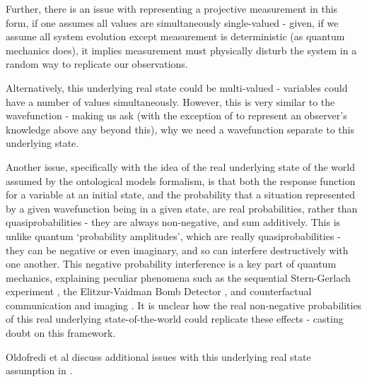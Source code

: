\documentclass[superscriptaddress, floatfix,nofootinbib,12pt]{revtex4-2}
\begin{document}
Further, there is an issue with representing a projective measurement in this form, if one assumes all values are simultaneously single-valued - given, if we assume all system evolution except measurement is deterministic (as quantum mechanics does), it implies measurement must physically disturb the system in a random way to replicate our observations.

Alternatively, this underlying real state could be multi-valued - variables could have a number of values simultaneously. However, this is very similar to the wavefunction - making us ask (with the exception of to represent an observer's knowledge above any beyond this), why we need a wavefunction separate to this underlying state.

Another issue, specifically with the idea of the real underlying state of the world assumed by the ontological models formalism, is that both the response function for a variable at an initial state, and the probability that a situation represented by a given wavefunction being in a given state, are real probabilities, rather than quasiprobabilities - they are always non-negative, and sum additively. This is unlike quantum `probability amplitudes', which are really quasiprobabilities - they can be negative or even imaginary, and so can interfere destructively with one another. This negative probability interference is a key part of quantum mechanics, explaining peculiar phenomena such as the sequential Stern-Gerlach experiment \cite{Sakurai2017Modern}, the Elitzur-Vaidman Bomb Detector \cite{Elitzur1993BombDet}, and counterfactual communication \cite{Salih2013CFComms,Hance2019Quantum} and imaging \cite{Hance2020CFGI}. It is unclear how the real non-negative probabilities of this real underlying state-of-the-world could replicate these effects - casting doubt on this framework.

Oldofredi et al discuss additional issues with this underlying real state assumption in \cite{Oldofredi2020Classification}.
\end{document}
